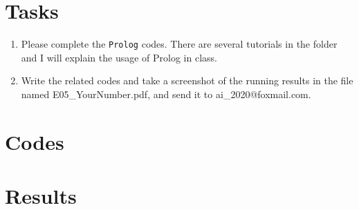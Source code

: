 ﻿\documentclass[a4paper, 11pt]{article}
\begin{document}
\section{Tasks}


\begin{enumerate}
\item Please complete the \texttt{Prolog} codes. There are several tutorials in the folder and I will explain the usage of Prolog in class.
\item Write the related codes and take a screenshot of the running results in the file named \textsf{E05\_YourNumber.pdf}, and send it to \textsf{ai\_2020@foxmail.com}.

\end{enumerate}
\section{Codes}
\section{Results}


%
%
\end{document}
